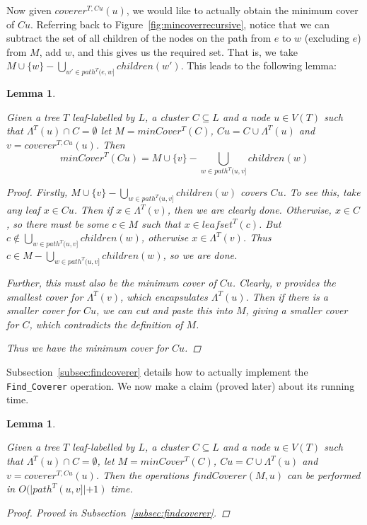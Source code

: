 \documentclass[12pt,a4paper]{article}
\newcommand{\leafset}{\Lambda}
\newtheorem{mincoverrecursive}[incompatibility]{Lemma}
\newtheorem{findcovererruntime}[incompatibility]{Lemma}
\begin{document}
    Now given $coverer^{T, Cu}(u)$, we would like to actually obtain the minimum cover of $Cu$. Referring back to Figure~\ref{fig:mincoverrecursive}, notice that we can subtract the set of all children of the nodes on the path from $e$ to $w$ (excluding $e$) from $M$, add $w$, and this gives us the required set. That is, we take $M \cup \{w\} - \bigcup_{w' \in path^{T}(e, w]} children(w')$. This leads to the following lemma:
    \newline

    \begin{mincoverrecursive}
        \label{lem:mincoverrecursive}

        Given a tree $T$ leaf-labelled by $L$, a cluster $C \subseteq L$ and a node $u \in V(T)$ such that $\leafset^{T}(u) \cap C = \emptyset$ let $M = minCover^{T}(C)$, $Cu = C \cup \leafset^{T}(u)$ and $v = coverer^{T, Cu}(u)$. Then
         \[minCover^{T}(Cu) = M \cup \{v\} - \bigcup_{w \in path^{T}(u, v]} children(w)\]

        \begin{proof}
            Firstly, $M \cup \{v\} - \bigcup_{w \in path^{T}(u, v]} children(w)$ covers $Cu$. To see this, take any leaf $x \in Cu$. Then if $x \in \leafset^{T}(v)$, then we are clearly done. Otherwise, $x \in C$, so there must be some $c \in M$ such that $x \in leafset^{T}(c)$. But $c \not\in \bigcup_{w \in path^{T}(u, v]} children(w)$, otherwise $x \in \leafset^{T}(v)$. Thus $c \in M - \bigcup_{w \in path^{T}(u, v]} children(w)$, so we are done.

            Further, this must also be the minimum cover of $Cu$. Clearly, $v$ provides the smallest cover for $\leafset^{T}(v)$, which encapsulates $\leafset^{T}(u)$. Then if there is a smaller cover for $Cu$, we can cut and paste this into $M$, giving a smaller cover for $C$, which contradicts the definition of $M$.

            Thus we have the minimum cover for $Cu$.
        \end{proof}
    \end{mincoverrecursive}

    Subsection~\ref{subsec:findcoverer} details how to actually implement the \texttt{Find\_Coverer} operation. We now make a claim (proved later) about its running time.
    \newline

    \begin{findcovererruntime}
        \label{lem:findcovererruntime}

        Given a tree $T$ leaf-labelled by $L$, a cluster $C \subseteq L$ and a node $u \in V(T)$ such that $\leafset^{T}(u) \cap C = \emptyset$, let $M = minCover^{T}(C)$, $Cu = C \cup \leafset^{T}(u)$ and $v = coverer^{T, Cu}(u)$. Then the operations $findCoverer(M, u)$ can be performed in $O(|path^{T}(u, v]| + 1)$ time.

        \begin{proof}
            Proved in Subsection~\ref{subsec:findcoverer}.
        \end{proof}
    \end{findcovererruntime}
\end{document}
